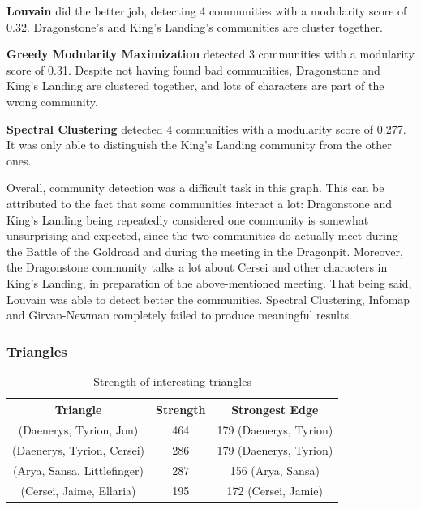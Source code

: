\documentclass[10pt,twocolumn,letterpaper]{article}
\begin{document}
\textbf{Louvain} did the better job, detecting 4 communities with a modularity score of 0.32. Dragonstone's and King's Landing's communities are cluster together.

\textbf{Greedy Modularity Maximization} detected 3 communities with a modularity score of 0.31. Despite not having found bad communities, Dragonstone and King's Landing are clustered together, and lots of characters are part of the wrong community.

\textbf{Spectral Clustering} detected 4 communities with a modularity score of 0.277. It was only able to distinguish the King's Landing community from the other ones.

Overall, community detection was a difficult task in this graph. This can be attributed to the fact that some communities interact a lot: Dragonstone and King's Landing being repeatedly considered one community is somewhat unsurprising and expected, since the two communities do actually meet during the Battle of the Goldroad and during the meeting in the Dragonpit. Moreover, the Dragonstone community talks a lot about Cersei and other characters in King's Landing, in preparation of the above-mentioned meeting. That being said, Louvain was able to detect better the communities. Spectral Clustering, Infomap and Girvan-Newman completely failed to produce meaningful results.


\subsubsection{Triangles}

\begin{table}[h!]
    \centering
    \small
    \begin{tabular}{c|c|c}
        Triangle & Strength & Strongest Edge  \\
        \hline
        (Daenerys, Tyrion, Jon) & 464 & 179 (Daenerys, Tyrion) \\
        (Daenerys, Tyrion, Cersei) & 286 & 179 (Daenerys, Tyrion) \\
        (Arya, Sansa, Littlefinger) & 287 & 156 (Arya, Sansa) \\
        (Cersei, Jaime, Ellaria) & 195 & 172 (Cersei, Jamie) \\
        \hline 
    \end{tabular} \\
    \vspace{0.2cm}
    \caption{Strength of interesting triangles}
    \label{tab:my_label}
\end{table}
\end{document}
